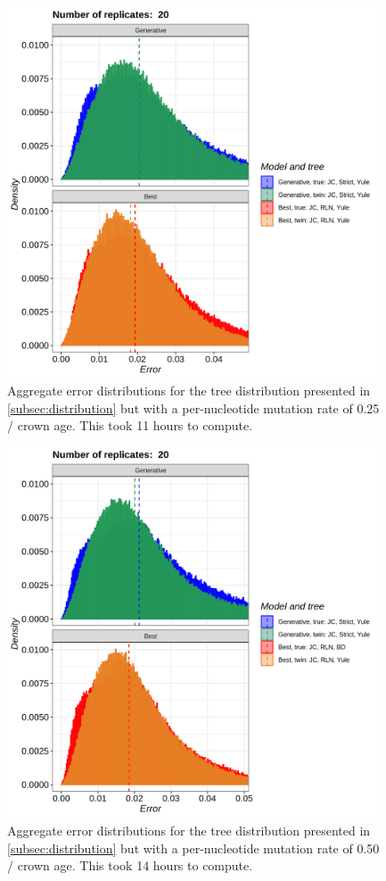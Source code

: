 \begin{figure}[H]
  \includegraphics[width=0.98\textwidth]{pirouette_example_35/errors.png}
  \caption{Aggregate error distributions for the tree distribution presented in \ref{subsec:distribution} but with a per-nucleotide mutation rate of 0.25 / crown age. This took 11 hours to compute.}
\end{figure}

\begin{figure}[H]
  \includegraphics[width=0.98\textwidth]{pirouette_example_36/errors.png}
  \caption{Aggregate error distributions for the tree distribution presented in \ref{subsec:distribution} but with a per-nucleotide mutation rate of 0.50 / crown age. This took 14 hours to compute.}
\end{figure}

